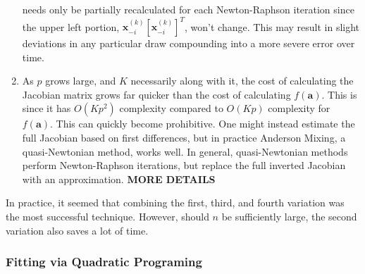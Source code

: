 \documentclass[11pt]{article}
\theoremstyle{definition}
\begin{document}
\begin{enumerate}
                needs only be partially recalculated for each Newton-Raphson iteration since the upper left portion, $\mathbf x_{-i}^{(k)}[\mathbf{x}_{-i}^{(k)}]^T$, won't change. This may result in slight deviations in any particular draw compounding into a more severe error over time.
            \item As $p$ grows large, and $K$ necessarily along with it, the cost of calculating the Jacobian matrix grows far quicker than the cost of calculating $f(\mathbf a)$. This is since it has $O(Kp^2)$ complexity compared to $O(Kp)$ complexity for $f(\mathbf a)$. This can quickly become prohibitive. One might instead estimate the full Jacobian based on first differences, but in practice Anderson Mixing, a quasi-Newtonian method, works well. In general, quasi-Newtonian methods perform Newton-Raphson iterations, but replace the full inverted Jacobian with an approximation. {\bf MORE DETAILS} 
        \end{enumerate}
        In practice, it seemed that combining the first, third, and fourth variation was the most successful technique. However, should $n$ be sufficiently large, the second variation also saves a lot of time. 

\subsubsection{Fitting via Quadratic Programing}
\end{document}
